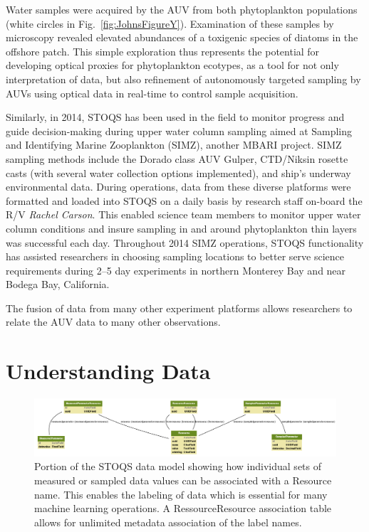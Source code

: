 \documentclass[conference]{IEEEtran}
\begin{document}
Water samples were acquired by the AUV from both phytoplankton populations (white circles in Fig.~\ref{fig:JohnsFigureY}).  Examination of these samples by microscopy revealed elevated abundances of a toxigenic species of diatoms in the offshore patch.  This simple exploration thus represents the potential for developing optical proxies for phytoplankton ecotypes, as a tool for not only interpretation of data, but also refinement of autonomously targeted sampling by AUVs using optical data in real-time to control sample acquisition.


Similarly, in 2014, STOQS has been used in the field to monitor progress and guide decision-making during upper water column sampling aimed at Sampling and Identifying Marine Zooplankton (SIMZ), another MBARI project.  SIMZ sampling methods include the Dorado class AUV Gulper, CTD/Niksin rosette casts (with several water collection options implemented), and ship’s underway environmental data.  During operations, data from these diverse platforms were formatted and loaded into STOQS on a daily basis by research staff on-board the R/V \textit{Rachel Carson}.  This enabled science team members to monitor upper water column conditions and insure sampling in and around phytoplankton thin layers was successful each day. Throughout 2014 SIMZ operations, STOQS functionality has assisted researchers in choosing sampling locations to better serve science requirements during 2–5 day experiments in northern Monterey Bay and near Bodega Bay, California.

The fusion of data from many other experiment platforms allows researchers to relate the AUV data to many other observations.

\section{Understanding Data}


\begin{figure}[htbp]
\centering
\includegraphics[width=0.9\linewidth]{stoqs_simple_model_labels.png}
\caption{Portion of the STOQS data model showing how individual sets of measured or sampled data values can be associated with a Resource name. This enables the labeling of data which is essential for many machine learning operations. A RessourceResource association table allows for unlimited metadata association of the label names.}
\label{fig:stoqs_simple_model_labels}
\end{figure}
\end{document}
